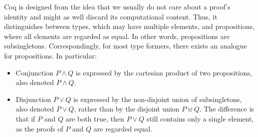 \documentclass[a4paper]{article}
\theoremstyle{definition}
\begin{document}
Coq is designed from the idea that we usually do not care about a proof's identity and might as well discard its computational content.
Thus, it distinguishes between types, which may have multiple elements, and propositions, where all elements are regarded as equal. In other words, propositions are subsingletons.
Correspondingly, for most type formers, there exists an analogue for propositions.
In particular:
\begin{itemize}
	\item Conjunction $P \wedge Q$ is expressed by the cartesian product of two propositions, also denoted $P \wedge Q$.
	\item Disjunction $P \vee Q$ is expressed by the non-disjoint union of subsingletons, also denoted $P \vee Q$, rather than by the disjoint union $P \uplus Q$. The difference is that if $P$ and $Q$ are both true, then $P \vee Q$ still contains only a single element, as the proofs of $P$ and $Q$ are regarded equal.
\end{itemize}

\end{document}
